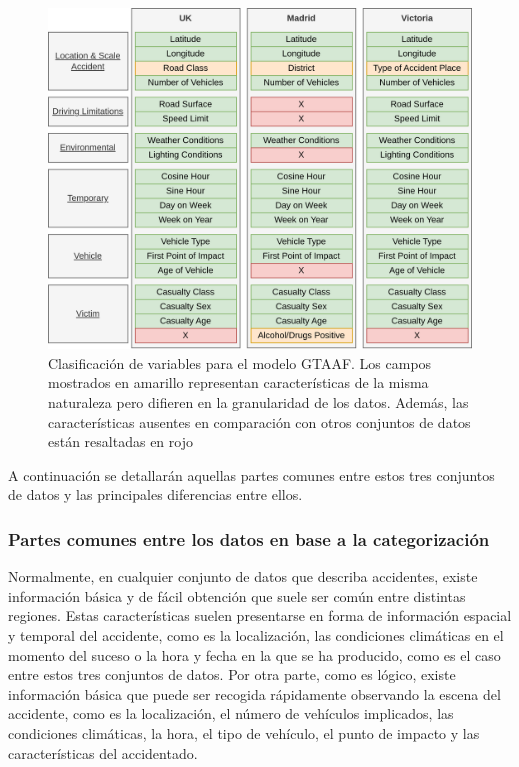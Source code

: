 \begin{figure}[H]
	\centering
	\includegraphics[width=12cm]{Figures/Dataset Comparative.png}
	\caption[Clasificación de variables para el modelo GTAAF]{Clasificación de variables para el modelo GTAAF. Los campos mostrados en amarillo representan características de la misma naturaleza pero difieren en la granularidad de los datos. Además, las características ausentes en comparación con otros conjuntos de datos están resaltadas en rojo}
	\label{FeaturesClassification}
\end{figure}

A continuación se detallarán aquellas partes comunes entre estos tres conjuntos de datos y las principales diferencias entre ellos.

\subsubsection*{Partes comunes entre los datos en base a la categorización}

Normalmente, en cualquier conjunto de datos que describa accidentes, existe información básica y de fácil obtención que suele ser común entre distintas regiones. Estas características suelen presentarse en forma de información espacial y temporal del accidente, como es la localización, las condiciones climáticas en el momento del suceso o la hora y fecha en la que se ha producido, como es el caso entre estos tres conjuntos de datos. Por otra parte, como es lógico, existe información básica que puede ser recogida rápidamente observando la escena del accidente, como es la localización, el número de vehículos implicados, las condiciones climáticas, la hora, el tipo de vehículo, el punto de impacto y las características del accidentado.


